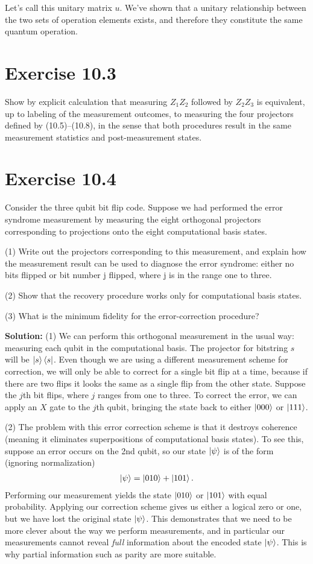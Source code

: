 \documentclass{book}
\begin{document}
    Let's call this unitary matrix $u$. We've shown that a unitary relationship between the two sets of operation elements exists, and therefore they constitute the same quantum operation. 
    
\section*{Exercise 10.3}
    Show by explicit calculation that measuring $Z_1 Z_2$ followed by $Z_2 Z_3$ is equivalent, up to labeling of the measurement outcomes, to measuring the four projectors defined by (10.5)–(10.8), in the sense that both procedures result in the same measurement statistics and post-measurement states.
    
\section*{Exercise 10.4}
    Consider the three qubit bit flip code. Suppose we had performed the error syndrome measurement by measuring the eight orthogonal projectors corresponding to projections onto the eight computational basis states.
    
    (1) Write out the projectors corresponding to this measurement, and explain how the measurement result can be used to diagnose the error syndrome: either no bits flipped or bit number j flipped, where j is in the range one to three.
    
    (2) Show that the recovery procedure works only for computational basis states.
    
    (3) What is the minimum fidelity for the error-correction procedure?
    
    \textbf{Solution:} (1) We can perform this orthogonal measurement in the usual way: measuring each qubit in the computational basis. The projector for bitstring $s$ will be $\ket{s}\bra{s}$. Even though we are using a different measurement scheme for correction, we will only be able to correct for a single bit flip at a time, because if there are two flips it looks the same as a single flip from the other state. Suppose the $j$th bit flips, where $j$ ranges from one to three. To correct the error, we can apply an $X$ gate to the $j$th qubit, bringing the state back to either $\ket{000}$ or $\ket{111}$.
    
    (2) The problem with this error correction scheme is that it destroys coherence (meaning it eliminates superpositions of computational basis states). To see this, suppose an error occurs on the 2nd qubit, so our state $\ket{\psi}$ is of the form (ignoring normalization)
    \begin{align}
        \ket{\psi} = \ket{010} + \ket{101}.
    \end{align}
    Performing our measurement yields the state $\ket{010}$ or $\ket{101}$ with equal probability. Applying our correction scheme gives us either a logical zero or one, but we have lost the original state $\ket{\psi}$. This demonstrates that we need to be more clever about the way we perform measurements, and in particular our measurements cannot reveal \emph{full} information about the encoded state $\ket{\psi}$. This is why partial information such as parity are more suitable. 
    
\end{document}
